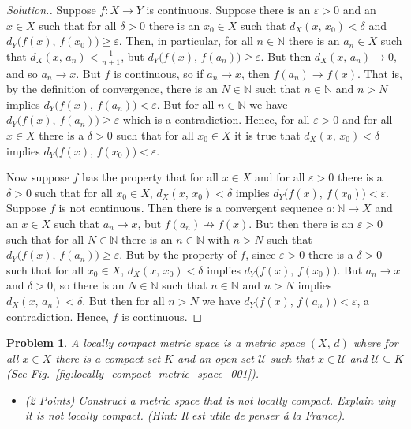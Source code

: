 \documentclass{article}
\theoremstyle{normal}
\newtheorem{problem}{Problem}
\begin{document}
    \begin{proof}[Solution.]
        Suppose $f:X\rightarrow{Y}$ is continuous. Suppose there is an
        $\varepsilon>0$ and an $x\in{X}$ such that for all $\delta>0$ there
        is an $x_{0}\in{X}$ such that $d_{X}(x,\,x_{0})<\delta$
        and $d_{Y}\big(f(x),\,f(x_{0})\big)\geq\varepsilon$.
        Then, in particular, for all $n\in\mathbb{N}$ there is an
        $a_{n}\in{X}$ such that $d_{X}(x,\,a_{n})<\frac{1}{n+1}$, but
        $d_{Y}\big(f(x),\,f(a_{n})\big)\geq\varepsilon$. But then
        $d_{X}(x,\,a_{n})\rightarrow{0}$, and so $a_{n}\rightarrow{x}$. But $f$
        is continuous, so if $a_{n}\rightarrow{x}$, then
        $f(a_{n})\rightarrow{f}(x)$. That is, by the definition of convergence,
        there is an $N\in\mathbb{N}$ such that $n\in\mathbb{N}$ and $n>N$
        implies $d_{Y}\big(f(x),\,f(a_{n})\big)<\varepsilon$. But for all
        $n\in\mathbb{N}$ we have $d_{Y}\big(f(x),\,f(a_{n})\big)\geq\varepsilon$
        which is a contradiction. Hence, for all $\varepsilon>0$ and for all
        $x\in{X}$ there is a $\delta>0$ such that for all $x_{0}\in{X}$ it is
        true that $d_{X}(x,\,x_{0})<\delta$ implies
        $d_{Y}\big(f(x),\,f(x_{0})\big)<\varepsilon$.
        \par\hfill\par
        Now suppose $f$ has the property that for all $x\in{X}$ and for
        all $\varepsilon>0$ there is a $\delta>0$ such that for all
        $x_{0}\in{X}$, $d_{X}(x,\,x_{0})<\delta$ implies
        $d_{Y}\big(f(x),\,f(x_{0})\big)<\varepsilon$. Suppose $f$ is not
        continuous. Then there is a convergent sequence
        $a:\mathbb{N}\rightarrow{X}$ and an $x\in{X}$ such that
        $a_{n}\rightarrow{x}$, but $f(a_{n})\not\rightarrow{f}(x)$.
        But then there is an $\varepsilon>0$ such that for all
        $N\in\mathbb{N}$ there is an $n\in\mathbb{N}$ with $n>N$ such that
        $d_{Y}\big(f(x),\,f(a_{n})\big)\geq\varepsilon$. But by the property
        of $f$, since $\varepsilon>0$ there is a $\delta>0$ such that
        for all $x_{0}\in{X}$, $d_{X}(x,\,x_{0})<\delta$ implies
        $d_{Y}\big(f(x),\,f(x_{0})\big)$. But $a_{n}\rightarrow{x}$ and
        $\delta>0$, so there is an $N\in\mathbb{N}$ such that $n\in\mathbb{N}$
        and $n>N$ implies $d_{X}(x,\,a_{n})<\delta$. But then for all
        $n>N$ we have $d_{Y}\big(f(x),\,f(a_{n})\big)<\varepsilon$, a
        contradiction. Hence, $f$ is continuous.
    \end{proof}
    \clearpage
    \color{blue}
    \begin{problem}
        A locally compact metric space is a metric space $(X,\,d)$ where for all
        $x\in{X}$ there is a compact set $K$ and an open set $\mathcal{U}$
        such that $x\in\mathcal{U}$ and $\mathcal{U}\subseteq{K}$
        (See Fig.~\ref{fig:locally_compact_metric_space_001}).
        \begin{itemize}
            \item (2 Points) Construct a metric space that is \textit{not}
                locally compact. Explain why it is not locally compact.
                (Hint: Il est utile de penser \'{a} la France).
        \end{itemize}
    \end{problem}
\end{document}
